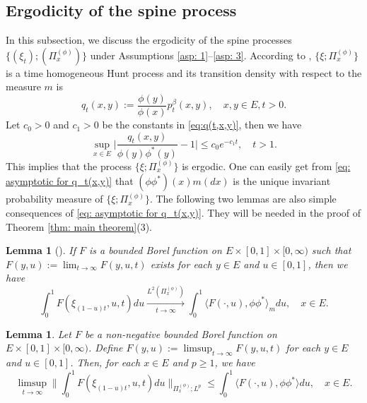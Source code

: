 \documentclass[12pt, a4paper]{amsart}
\newtheorem{lem}[thm]{Lemma}
\theoremstyle{definition}
\numberwithin{equation}{section}
\begin{document}
\subsection{Ergodicity of the spine process}
\label{sec: Ergodicity}
	In this subsection, we discuss the ergodicity of the spine processes
	$\{(\xi_t); (\Pi^{(\phi)}_x)\}$
	under Assumptions \ref{asp: 1}--\ref{asp: 3}.
	According to \cite{KimSong2008Intrinsic}, $\{\xi; \Pi^{(\phi)}_x\}$ is a time homogeneous Hunt process and its transition density with respect to the measure $m$ is
\[
	q_t(x,y) := \frac{\phi(y)}{\phi(x)} p^\beta_t(x,y),
	\quad x,y\in E, t>0.
\]
Let   $c_0>0$ and $c_1>0$ be the constants  in \eqref{eq:q(t,x,y)}, then we have
\[\label{eq: asymptotic for q_t(x,y)}
	\sup_{x\in E} \Big| \frac{q_t(x,y)}{\phi(y)\phi^*(y)} - 1\Big|
	\leq c_0 e^{-c_1 t},
	\quad t > 1.
\]
	This implies that the process $\{\xi; \Pi^{(\phi)}_x\}$ is ergodic.
	One can easily get from \eqref{eq: asymptotic for q_t(x,y)} that $(\phi\phi^*)(x)m(dx)$ is the unique invariant probability measure of $\{\xi; \Pi^{(\phi)}_x\}$.
	The following two lemmas are also simple consequences of \eqref{eq: asymptotic for q_t(x,y)}.
	They will be needed in the proof of  Theorem \ref{thm: main theorem}(3).
\begin{lem}[{\cite[Lemma 5.6]{RenSongSun2017Spine}}] \label{lem: ergodicity of the underlying process}
	If $F$ is a bounded Borel function on $E\times [0,1]\times [0,\infty)$ such that $F(y,u):= \lim_{t\to \infty} F(y,u,t)$ exists for each $y\in E$ and $u \in [0,1]$,
	then we have
\[
	\int_0^1 F(\xi_{(1-u)t},u,t) du
\xrightarrow[t\to \infty]{ L^2(\Pi_x^{(\phi)})}
\int_0^1 \langle F(\cdot , u), \phi\phi^*\rangle_m du,
	\quad x\in E.
\]
\end{lem}
\begin{lem}\label{lem: Fatou-ergodic lemma for the uderlying process}
	Let $F$ be a non-negative bounded Borel function on $E\times [0,1]\times [0,\infty)$.
	Define $F(y,u):= \limsup_{t\to \infty} F(y,u,t)$ for each $y\in E$ and $u \in [0,1]$.
	Then, for each $x\in E$ and $p \geq 1$, we have
\[
	\limsup_{ t \to \infty}  \Big\| \int_0^1 F(\xi_{(1-u) t },u,t) du  \Big\|_{\Pi_x^{(\phi)};L^p}
	\leq \int_0^1 \langle F(\cdot, u), \phi \phi^*\rangle du,
	\quad x\in E.
\]
\end{lem}
\end{document}
